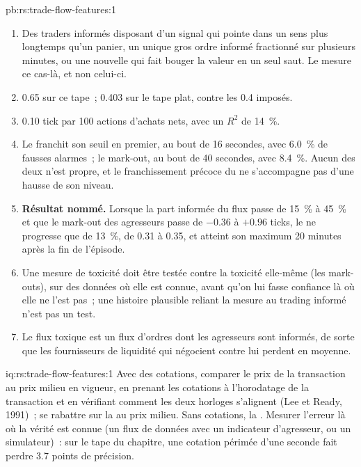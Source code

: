 \begin{solution}{pb:rs:trade-flow-features:1}
\begin{enumerate}
\item Des traders informés disposant d'un signal qui pointe dans un sens plus longtemps qu'un panier, un unique gros ordre informé fractionné sur plusieurs minutes, ou une nouvelle
qui fait bouger la valeur en un seul saut. Le  mesure ce cas-là, et non celui-ci.
\item 0.65 sur ce tape~; 0.403 sur le tape plat, contre les 0.4 imposés.
\item 0.10 tick par 100 actions d'achats nets, avec un $R^2$ de 14~\%.
\item Le  franchit son seuil en premier, au bout de 16 secondes, avec 6.0~\% de fausses alarmes~; le mark-out, au bout de 40 secondes, avec 8.4~\%. Aucun des deux n'est propre, et
le franchissement précoce du  ne s'accompagne pas d'une hausse de son niveau.
\item \textbf{Résultat nommé.} Lorsque la part informée du flux passe de 15~\% à 45~\% et que le mark-out des agresseurs passe de $-0.36$ à
$+0.96$ ticks, le  ne progresse que de 13~\%, de 0.31 à 0.35, et atteint son maximum 20 minutes après la fin de l'épisode.
\item Une mesure de toxicité doit être testée contre la toxicité elle-même (les mark-outs), sur des données où elle est connue, avant qu'on lui fasse confiance là où elle
ne l'est pas~; une histoire plausible reliant la mesure au trading informé n'est pas un test.
\item Le flux toxique est un flux d'ordres dont les agresseurs sont informés, de sorte que les fournisseurs de liquidité qui négocient contre lui perdent en moyenne.
\end{enumerate}
\end{solution}

\begin{solution}{iq:rs:trade-flow-features:1}
Avec des cotations, comparer le prix de la transaction au prix milieu en vigueur, en prenant les cotations à l'horodatage de la transaction et en vérifiant comment les deux horloges
s'alignent (Lee et Ready, 1991)~; se rabattre sur la  au prix milieu. Sans cotations, la . Mesurer l'erreur là où la vérité est
connue (un flux de données avec un indicateur d'agresseur, ou un simulateur)~: sur le tape du chapitre, une cotation périmée d'une seconde fait perdre 3.7 points de précision.
\end{solution}

